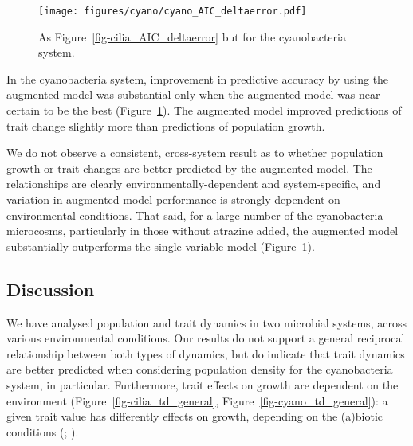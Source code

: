 \documentclass[
  letterpaper,
  DIV=11,
  numbers=noendperiod]{scrartcl}
\begin{document}
\begin{figure}

{\centering \texttt{[image: figures/cyano/cyano\_AIC\_deltaerror.pdf]}

}

\caption{\label{fig-cyano_AIC_deltaerror}As
Figure~\ref{fig-cilia_AIC_deltaerror} but for the cyanobacteria system.}

\end{figure}

In the cyanobacteria system, improvement in predictive accuracy by using
the augmented model was substantial only when the augmented model was
near-certain to be the best (Figure~\ref{fig-cyano_AIC_deltaerror}). The
augmented model improved predictions of trait change slightly more than
predictions of population growth.

We do not observe a consistent, cross-system result as to whether
population growth or trait changes are better-predicted by the augmented
model. The relationships are clearly environmentally-dependent and
system-specific, and variation in augmented model performance is
strongly dependent on environmental conditions. That said, for a large
number of the cyanobacteria microcosms, particularly in those without
atrazine added, the augmented model substantially outperforms the
single-variable model (Figure~\ref{fig-cyano_AIC_deltaerror}).

\subsection{Discussion}\label{sec-DAE_discussion}

We have analysed population and trait dynamics in two microbial systems,
across various environmental conditions. Our results do not support a
general reciprocal relationship between both types of dynamics, but do
indicate that trait dynamics are better predicted when considering
population density for the cyanobacteria system, in particular.
Furthermore, trait effects on growth are dependent on the environment
(Figure~\ref{fig-cilia_td_general}, Figure~\ref{fig-cyano_td_general}):
a given trait value has differently effects on growth, depending on the
(a)biotic conditions (;
).
\end{document}
